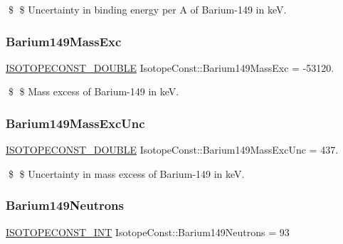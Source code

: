 \$ \$ Uncertainty in binding energy per A of Barium-\/149 in keV. \mbox{\label{group___isotope_const-_barium-_ba149_gab63eaa70ec2cd950660c8c6a3e9a9f88}} 
\subsubsection{\texorpdfstring{Barium149\+Mass\+Exc}{Barium149MassExc}}
{\footnotesize\ttfamily \mbox{\hyperlink{group___isotope_const-_macros_ga8f45a7272ce02c0b4c65c44636ed719a}{I\+S\+O\+T\+O\+P\+E\+C\+O\+N\+S\+T\+\_\+\+D\+O\+U\+B\+LE}} Isotope\+Const\+::\+Barium149\+Mass\+Exc = -\/53120.}

\$ \$ Mass excess of Barium-\/149 in keV. \mbox{\label{group___isotope_const-_barium-_ba149_ga74c034aa51d5f01b3084691d72011062}} 
\subsubsection{\texorpdfstring{Barium149\+Mass\+Exc\+Unc}{Barium149MassExcUnc}}
{\footnotesize\ttfamily \mbox{\hyperlink{group___isotope_const-_macros_ga8f45a7272ce02c0b4c65c44636ed719a}{I\+S\+O\+T\+O\+P\+E\+C\+O\+N\+S\+T\+\_\+\+D\+O\+U\+B\+LE}} Isotope\+Const\+::\+Barium149\+Mass\+Exc\+Unc = 437.}

\$ \$ Uncertainty in mass excess of Barium-\/149 in keV. \mbox{\label{group___isotope_const-_barium-_ba149_ga83e99340d63f8796b19f65b81d9f68c8}} 
\subsubsection{\texorpdfstring{Barium149\+Neutrons}{Barium149Neutrons}}
{\footnotesize\ttfamily \mbox{\hyperlink{group___isotope_const-_macros_ga5f18360b3e99483a35c32d789e62621c}{I\+S\+O\+T\+O\+P\+E\+C\+O\+N\+S\+T\+\_\+\+I\+NT}} Isotope\+Const\+::\+Barium149\+Neutrons = 93}

